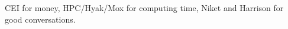 \documentclass[journal=apchd5,manuscript=article]{achemso}
\begin{document}
\begin{acknowledgement}
CEI for money, HPC/Hyak/Mox for computing time, Niket and Harrison for good conversations.
\end{acknowledgement}


\end{document}
